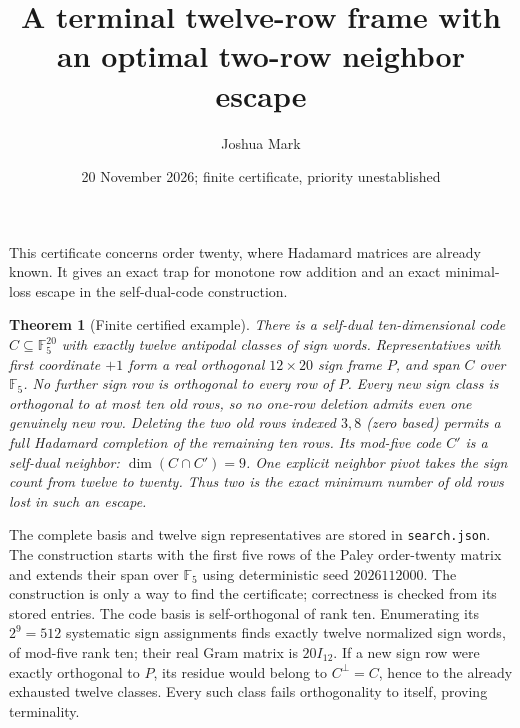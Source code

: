 \documentclass[11pt]{article}
\title{A terminal twelve-row frame with an optimal two-row neighbor escape}
\author{Joshua Mark}
\date{20 November 2026; finite certificate, priority unestablished}
\newtheorem{theorem}{Theorem}
\begin{document}
\maketitle
This certificate concerns order twenty, where Hadamard matrices are
already known. It gives an exact trap for monotone row addition and
an exact minimal-loss escape in the self-dual-code construction.

\begin{theorem}[Finite certified example]
There is a self-dual ten-dimensional code $C\subseteq\mathbb F_5^{20}$
with exactly twelve antipodal classes of sign words. Representatives
with first coordinate $+1$ form a real orthogonal $12\times20$ sign
frame $P$, and span $C$ over $\mathbb F_5$.
No further sign row is orthogonal to every row of $P$.
Every new sign class is orthogonal to at most ten old rows, so no
one-row deletion admits even one genuinely new row.
Deleting the two old rows indexed $3,8$ (zero based) permits a full
Hadamard completion of the remaining ten rows. Its mod-five code
$C'$ is a self-dual neighbor: $\dim(C\cap C')=9$.
One explicit neighbor pivot takes the sign count from twelve to twenty.
Thus two is the exact minimum number of old rows lost in such an escape.
\end{theorem}

The complete basis and twelve sign representatives are stored in
\texttt{search.json}. The construction starts with the first five rows
of the Paley order-twenty matrix and extends their span over
$\mathbb F_5$ using deterministic seed $2026112000$.
The construction is only a way to find the certificate; correctness
is checked from its stored entries. The code basis is self-orthogonal
of rank ten. Enumerating its $2^9=512$ systematic sign assignments
finds exactly twelve normalized sign words, of mod-five rank ten;
their real Gram matrix is $20I_{12}$.
If a new sign row were exactly orthogonal to $P$, its residue would
belong to $C^\perp=C$, hence to the already exhausted twelve classes.
Every such class fails orthogonality to itself, proving terminality.
\end{document}
